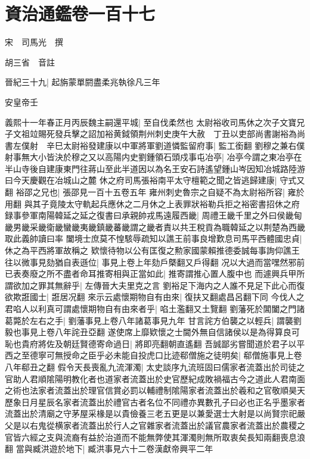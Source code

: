 \chapter{資治通鑑卷一百十七}


宋　司馬光　撰

胡三省　音註

晉紀三十九|{
	起旃蒙單閼盡柔兆執徐凡三年}


安皇帝壬

義熙十一年春正月丙辰魏主嗣還平城|{
	至自伐柔然也}
太尉裕收司馬休之次子文寶兄子文祖竝賜死發兵擊之詔加裕黄鉞領荆州刺史庚午大赦　丁丑以吏部尚書謝裕為尚書左僕射　辛巳太尉裕發建康以中軍將軍劉道憐監留府事|{
	監工銜翻}
劉穆之兼右僕射事無大小皆決於穆之又以高陽内史劉鍾領石頭戍事屯冶亭|{
	冶亭今謂之東冶亭在半山寺後自建康東門往蔣山至此半道因以為名王安石詩遙望鍾山岑因知冶城路陸游曰今天慶觀在冶城山之麓}
休之府司馬張裕南平太守檀範之聞之皆逃歸建康|{
	守式又翻}
裕邵之兄也|{
	張邵見一百十五卷五年}
雍州刺史魯宗之自疑不為太尉裕所容|{
	雍於用翻}
與其子竟陵太守軌起兵應休之二月休之上表罪狀裕勒兵拒之裕密書招休之府録事參軍南陽韓延之延之復書曰承親帥戎馬遠履西畿|{
	周禮王畿千里之外曰侯畿甸畿男畿采畿衛畿蠻畿夷畿鎮畿蕃畿謂之畿者責以共王稅貢為職韓延之以荆楚為西畿取此義帥讀曰率}
闔境士庶莫不惶駭辱疏知以譙王前事良增歎息司馬平西體國忠貞|{
	休之為平西將軍故稱之}
欵懷待物以公有匡復之勲家國蒙賴推德委誠每事詢仰譙王往以微事見劾猶自表遜位|{
	事見上卷上年劾戶槩翻又戶得翻}
况以大過而當嘿然邪前已表奏廢之所不盡者命耳推寄相與正當如此|{
	推寄謂推心置人腹中也}
而遽興兵甲所謂欲加之罪其無辭乎|{
	左傳晉大夫里克之言}
劉裕足下海内之人誰不見足下此心而復欲欺誑國士|{
	誑居况翻}
來示云處懷期物自有由來|{
	復扶又翻處昌呂翻下同}
今伐人之君啗人以利真可謂處懷期物自有由來者乎|{
	啗土濫翻又土覽翻}
劉藩死於閶闔之門諸葛斃於左右之手|{
	劉藩事見上卷八年諸葛事見九年}
甘言詫方伯襲之以輕兵|{
	謂襲劉毅也事見上卷八年詫丑亞翻}
遂使席上靡欵懷之士閫外無自信諸侯以是為得算良可恥也貴府將佐及朝廷賢德寄命過日|{
	將即亮翻朝直遙翻}
吾誠鄙劣嘗聞道於君子以平西之至德寧可無授命之臣乎必未能自投虎口比迹郗僧施之徒明矣|{
	郗僧施事見上卷八年郗丑之翻}
假令天長喪亂九流渾濁|{
	太史談序九流班固曰儒家者流蓋出於司徒之官助人君順隂陽明教化者也道家者流蓋出於史官歷紀成敗禍福古今之道此人君南面之術也法家者流蓋出於理官信賞必罰以輔禮制隂陽家者流蓋出於羲和之官敬順昊天歷象日月星辰名家者流蓋出於禮官古者名位不同禮亦異數孔子曰必也正名乎墨家者流蓋出於清廟之守茅屋采椽是以貴儉養三老五更是以兼愛選士大射是以尚賢宗祀嚴父是以右鬼從横家者流蓋出於行人之官雜家者流蓋出於議官農家者流蓋出於農稷之官皆六經之支與流裔有益於治道而不能無弊使其渾濁則無所取衷矣長知兩翻喪息浪翻}
當與臧洪遊於地下|{
	臧洪事見六十二卷漢獻帝興平二年}
